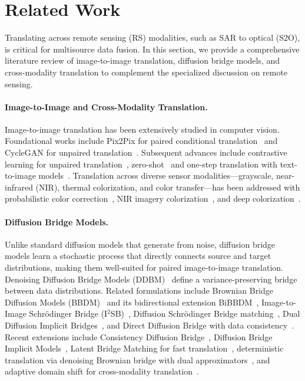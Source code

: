 \section{Related Work}
\label{sec:related_work}

Translating across remote sensing (RS) modalities, such as SAR to optical (S2O), is critical for multisource data fusion. In this section, we provide a comprehensive literature review of image-to-image translation, diffusion bridge models, and cross-modality translation to complement the specialized discussion on remote sensing.

\paragraph{Image-to-Image and Cross-Modality Translation.}
Image-to-image translation has been extensively studied in computer vision. Foundational works include Pix2Pix for paired conditional translation~\cite{isolaImageToImageTranslationConditional2017} and CycleGAN for unpaired translation~\cite{zhuUnpairedImageToImageTranslation2017}. Subsequent advances include contrastive learning for unpaired translation~\cite{parkContrastiveLearningUnpaired2020}, zero-shot~\cite{parmarZeroshotImagetoImageTranslation2023} and one-step translation with text-to-image models~\cite{parmarOneStepImageTranslation2024}. Translation across diverse sensor modalities---grayscale, near-infrared (NIR), thermal colorization, and color transfer---has been addressed with probabilistic color correction~\cite{oliveiraProbabilisticApproachColor2015}, NIR imagery colorization~\cite{suarezInfraRedImageryColorization2018}, and deep colorization~\cite{zhangColorfulImageColorization2016,majumder2020deep}.

\paragraph{Diffusion Bridge Models.}
Unlike standard diffusion models that generate from noise, diffusion bridge models learn a stochastic process that directly connects source and target distributions, making them well-suited for paired image-to-image translation. Denoising Diffusion Bridge Models (DDBM)~\cite{zhouDenoisingDiffusionBridge2024} define a variance-preserving bridge between data distributions. Related formulations include Brownian Bridge Diffusion Models (BBDM)~\cite{Li_2023_CVPR} and its bidirectional extension BiBBDM~\cite{xueBiBBDMBidirectionalImage2025}, Image-to-Image Schr\"odinger Bridge (I$^2$SB)~\cite{liuI2SBImagetoImageSchrodinger2023}, Diffusion Schr\"odinger Bridge matching~\cite{shiDiffusionSchrodingerBridge2023}, Dual Diffusion Implicit Bridges~\cite{suDualDiffusionImplicit2023a}, and Direct Diffusion Bridge with data consistency~\cite{chungDirectDiffusionBridge2023}. Recent extensions include Consistency Diffusion Bridge~\cite{heConsistencyDiffusionBridge2024}, Diffusion Bridge Implicit Models~\cite{zhengDiffusionBridgeImplicit2025}, Latent Bridge Matching for fast translation~\cite{chadebecLBMLatentBridge2025a}, deterministic translation via denoising Brownian bridge with dual approximators~\cite{xiaoDeterministicImagetoImageTranslation2025a}, and adaptive domain shift for cross-modality translation~\cite{wangAdaptiveDomainShift2026a}.

